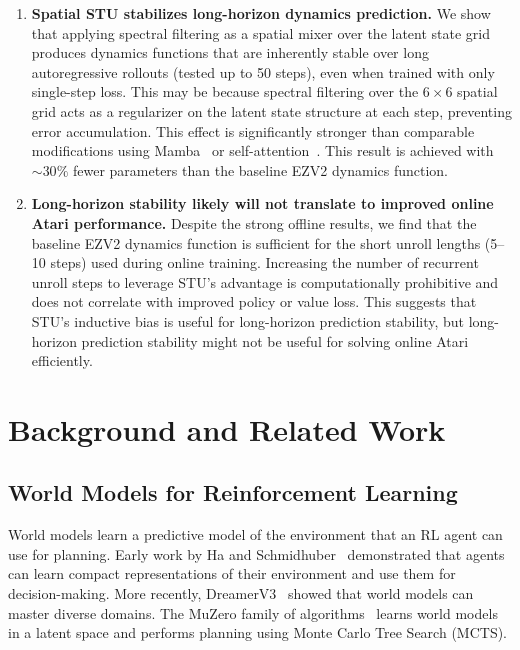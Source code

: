 \documentclass[10pt,twocolumn]{IEEEtran}
\begin{document}
\begin{enumerate}
    \item \textbf{Spatial STU stabilizes long-horizon dynamics prediction.} We show that applying spectral filtering as a spatial mixer over the latent state grid produces dynamics functions that are inherently stable over long autoregressive rollouts (tested up to 50 steps), even when trained with only single-step loss. This may be because spectral filtering over the $6 \times 6$ spatial grid acts as a regularizer on the latent state structure at each step, preventing error accumulation. This effect is significantly stronger than comparable modifications using Mamba~\cite{gu2024mamba} or self-attention~\cite{vaswani2017attention}. This result is achieved with ${\sim}30\%$ fewer parameters than the baseline EZV2 dynamics function.

    \item \textbf{Long-horizon stability likely will not translate to improved online Atari performance.} Despite the strong offline results, we find that the baseline EZV2 dynamics function is sufficient for the short unroll lengths (5--10 steps) used during online training. Increasing the number of recurrent unroll steps to leverage STU's advantage is computationally prohibitive and does not correlate with improved policy or value loss. This suggests that STU's inductive bias is useful for long-horizon prediction stability, but long-horizon prediction stability might not be useful for solving online Atari efficiently.
\end{enumerate}

\section{Background and Related Work}
\label{sec:background}

\subsection{World Models for Reinforcement Learning}

World models learn a predictive model of the environment that an RL agent can use for planning. Early work by Ha and Schmidhuber~\cite{ha2018world} demonstrated that agents can learn compact representations of their environment and use them for decision-making. More recently, DreamerV3~\cite{hafner2023dreamerv3} showed that world models can master diverse domains. The MuZero family of algorithms~\cite{schrittwieser2020mastering, wang2024efficientzero} learns world models in a latent space and performs planning using Monte Carlo Tree Search (MCTS).
\end{document}
